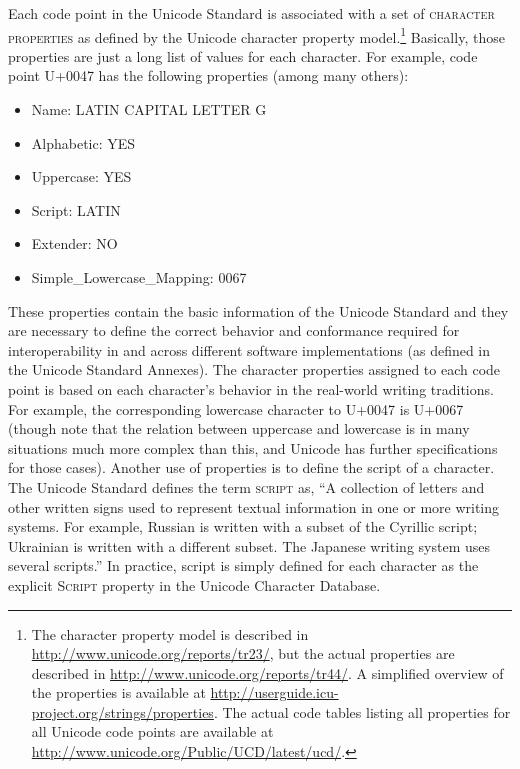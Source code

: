Each code point in the Unicode Standard is associated with a set of
\textsc{character properties} as defined by the Unicode character property
model.\footnote{The character property model is described in
\url{http://www.unicode.org/reports/tr23/}, but the actual properties are
described in \url{http://www.unicode.org/reports/tr44/}. A simplified overview
of the properties is available at
\url{http://userguide.icu-project.org/strings/properties}. The actual code
tables listing all properties for all Unicode code points are available at
\url{http://www.unicode.org/Public/UCD/latest/ucd/}.} Basically, those
properties are just a long list of values for each character. For example, code
point U+0047 has the following properties (among many others): \begin{itemize}
	\item Name: LATIN CAPITAL LETTER G \item Alphabetic: YES \item
	Uppercase: YES \item Script: LATIN \item Extender: NO \item
	Simple\_Lowercase\_Mapping: 0067
\end{itemize}

These properties contain the basic information of the Unicode Standard and they
are necessary to define the correct behavior and conformance required for
interoperability in and across different software implementations (as defined in
the Unicode Standard Annexes). The character properties assigned to each code
point is based on each character's behavior in the real-world writing
traditions. For example, the corresponding lowercase character to U+0047 is
U+0067 (though note that the relation between uppercase and lowercase is in many
situations much more complex than this, and Unicode has further specifications
for those cases). Another use of properties is to define the script of a
character. The Unicode Standard defines the term \textsc{script} as, ``A
collection of letters and other written signs used to represent textual
information in one or more writing systems. For example, Russian is written with
a subset of the Cyrillic script; Ukrainian is written with a different subset.
The Japanese writing system uses several scripts.'' In practice, script is
simply defined for each character as the explicit \textsc{Script} property in
the Unicode Character Database.

